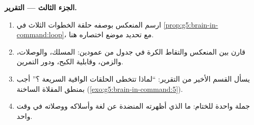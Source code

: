 \begin{problem}
\medskip\noindent\textbf{الجزء الثالث --- التقرير.}
\begin{enumerate}[resume]
  \item ارسم المنعكس بوصفه حلقة الخطوات الثلاث في
        \cref{prop:g5:brain-in-command:loop}، مع تحديد
        موضع اختصاره هنا.
  \item قارن بين المنعكس والتقاط الكرة في جدول من
        عمودين: المسلك، والوصلات، والزمن، وقابلية الكبح،
        ودور التمرين.
  \item يسأل القسم الأخير من التقرير: ``لماذا تتخطى
        الحلقات الواقية السريعة ؟'' أجب بمنطق
        المقلاة الساخنة
        (\cref{exo:g5:brain-in-command:5}).
  \item جملة واحدة للختام: ما الذي أظهرته المنضدة عن لغة
         وأسلاكه ووصلاته في وقت واحد.
\end{enumerate}
\end{problem}

